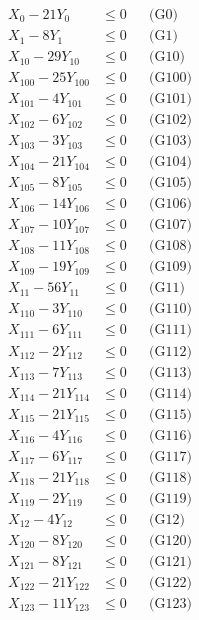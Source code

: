 \documentclass[a4paper,10pt]{article}
\begin{document}
\allowdisplaybreaks
{\small\begin{align}
X_{0} - 21Y_{0} &\leq 0 && \text{(G0)} \\
X_{1} - 8Y_{1} &\leq 0 && \text{(G1)} \\
X_{10} - 29Y_{10} &\leq 0 && \text{(G10)} \\
X_{100} - 25Y_{100} &\leq 0 && \text{(G100)} \\
X_{101} - 4Y_{101} &\leq 0 && \text{(G101)} \\
X_{102} - 6Y_{102} &\leq 0 && \text{(G102)} \\
X_{103} - 3Y_{103} &\leq 0 && \text{(G103)} \\
X_{104} - 21Y_{104} &\leq 0 && \text{(G104)} \\
X_{105} - 8Y_{105} &\leq 0 && \text{(G105)} \\
X_{106} - 14Y_{106} &\leq 0 && \text{(G106)} \\
X_{107} - 10Y_{107} &\leq 0 && \text{(G107)} \\
X_{108} - 11Y_{108} &\leq 0 && \text{(G108)} \\
X_{109} - 19Y_{109} &\leq 0 && \text{(G109)} \\
X_{11} - 56Y_{11} &\leq 0 && \text{(G11)} \\
X_{110} - 3Y_{110} &\leq 0 && \text{(G110)} \\
X_{111} - 6Y_{111} &\leq 0 && \text{(G111)} \\
X_{112} - 2Y_{112} &\leq 0 && \text{(G112)} \\
X_{113} - 7Y_{113} &\leq 0 && \text{(G113)} \\
X_{114} - 21Y_{114} &\leq 0 && \text{(G114)} \\
X_{115} - 21Y_{115} &\leq 0 && \text{(G115)} \\
\allowbreak
X_{116} - 4Y_{116} &\leq 0 && \text{(G116)} \\
X_{117} - 6Y_{117} &\leq 0 && \text{(G117)} \\
X_{118} - 21Y_{118} &\leq 0 && \text{(G118)} \\
X_{119} - 2Y_{119} &\leq 0 && \text{(G119)} \\
X_{12} - 4Y_{12} &\leq 0 && \text{(G12)} \\
X_{120} - 8Y_{120} &\leq 0 && \text{(G120)} \\
X_{121} - 8Y_{121} &\leq 0 && \text{(G121)} \\
X_{122} - 21Y_{122} &\leq 0 && \text{(G122)} \\
X_{123} - 11Y_{123} &\leq 0 && \text{(G123)} \\

\end{align}}
\end{document}
